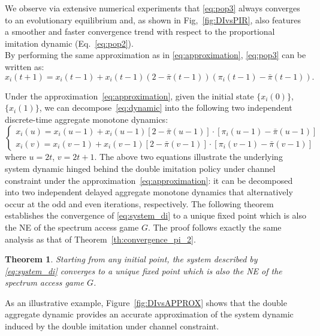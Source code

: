 \documentclass[12pt, onecolumn]{IEEEtran}
\theoremstyle{plain}
\newtheorem{theorem}{Theorem}
\theoremstyle{definition}
\begin{document}
We observe via extensive numerical experiments that \eqref{eq:pop3} always converges to an evolutionary equilibrium and, as shown in Fig,~\ref{fig:DIvsPIR}, also
features a smoother and faster convergence trend with respect to the proportional imitation dynamic (Eq.~\eqref{eq:pop2}).\\
By performing the same approximation as in \eqref{eq:approximation},
\eqref{eq:pop3} can be written as:
\begin{equation}
x_i(t+1)=x_i(t-1)+x_i(t-1)(2-\bar{\pi}(t-1))(\pi_i(t-1)-\bar{\pi}(t-1)).
\label{eq:dynamic}
\end{equation}


Under the approximation~\eqref{eq:approximation}, given the initial state $\{x_i(0)\}$, $\{x_i(1)\}$, we can decompose~\eqref{eq:dynamic} into the following two independent discrete-time aggregate monotone dynamics:
\begin{equation}
\begin{cases}
x_i(u)=x_i(u-1)+ x_i(u-1)[2-\bar{\pi}(u-1)]\cdot[\pi_i(u-1)-\bar{\pi}(u-1)]\\
x_i(v)=x_i(v-1)+ x_i(v-1)[2-\bar{\pi}(v-1)]\cdot[\pi_i(v-1)-\bar{\pi}(v-1)]
\end{cases}
\label{eq:system_di}
\end{equation}
where $u=2t$, $v=2t+1$. The above two equations illustrate the underlying system dynamic hinged behind the double imitation policy under channel constraint under the approximation~\eqref{eq:approximation}: it can be decomposed into two independent delayed aggregate monotone dynamics that alternatively occur at the odd and even iterations, respectively. The following theorem establishes the convergence of \eqref{eq:system_di} to a unique fixed point which is also the NE of the spectrum access game $G$. The proof follows exactly the same analysis as that of Theorem~\ref{th:convergence_pi_2}.

\begin{theorem}
Starting from any initial point, the system described by \eqref{eq:system_di} converges to a unique fixed point which is also the NE of the spectrum access game $G$.
\label{th:convergence_di_2}
\end{theorem}

As an illustrative example, Figure~\ref{fig:DIvsAPPROX} shows that the double aggregate dynamic provides an accurate approximation of the system dynamic induced by the
double imitation under channel constraint.
\end{document}
